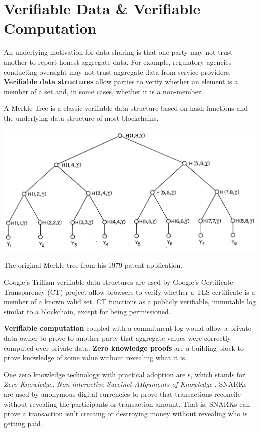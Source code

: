 \documentclass[nobib]{tufte-handout}
\begin{document}
\section{Verifiable Data \& Verifiable Computation}
\label{verifiable}

An underlying motivation for data sharing is that one party may not trust
another to report honest aggregate data. For example, regulatory agencies
conducting oversight may not trust aggregate data from service providers.
\textbf{Verifiable data structures} allow parties to verify whether an element
is a member of a set and, in some cases, whether it is a non-member.

A Merkle Tree \cite{merkle1979} is a classic verifiable data structure based on
hash functions and the underlying data structure of most blockchains.

\begin{marginfigure} \includegraphics[width=\linewidth]{merkle} \caption{The
original Merkle tree from his 1979 patent application.} \label{fig:merkle}
\end{marginfigure}

Google’s Trillian \cite{google-trillian} verifiable data structures are used by
Google's Certificate Transparency (CT) project allow browsers to verify whether
a TLS certificate is a member of a known valid set. CT functions as a publicly
verifiable, immutable log similar to a blockchain, except for being
permissioned.

\textbf{Verifiable computation} coupled with a commitment log would allow a
private data owner to prove to another party that aggregate values were correctly
computed over private data. \textbf{Zero knowledge proofs} are a building block
to prove knowledge of some value without revealing what it is.

One zero knowledge technology with practical adoption are s,
which stands for \textit{Zero Knowledge, Non-interactive Succinct ARguments of
Knowledge} \cite{DBLP:conf/sp/Ben-SassonCG0MTV14}. SNARKs are used by anonymous
digital currencies to prove that transactions reconcile without revealing the
participants or transaction amount. That is, SNARKs can prove a transaction
isn’t creating or destroying money without revealing who is getting paid.
\end{document}
